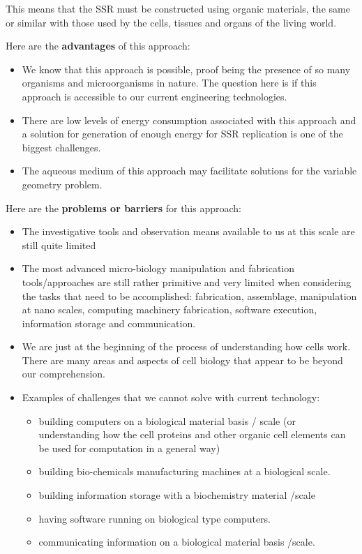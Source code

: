 This means that the SSR must be constructed using organic materials, the
same or similar with those used by the cells, tissues and organs of the
living world.

Here are the \textbf{advantages} of this approach:

\begin{itemize}
\item We know that this approach is possible, proof being the presence
of so many organisms and microorganisms in nature. The question here is
if this approach is accessible to our current engineering technologies.
\item There are low levels of energy consumption associated with this
approach and a solution for generation of enough energy for SSR
replication is one of the biggest challenges.
\item The aqueous medium of this approach may facilitate solutions for
the variable geometry problem.
\end{itemize}

Here are the \textbf{problems or barriers} for this approach:

\begin{itemize}
\item The investigative tools and observation means available to us at
this scale are still quite limited
\item The most advanced micro-biology manipulation and fabrication
tools/approaches are still rather primitive and very limited when
considering the tasks that need to be accomplished: fabrication,
assemblage, manipulation at nano scales, computing machinery
fabrication, software execution, information storage and communication.
\item We are just at the beginning of the process of understanding how
cells work. There are many areas and aspects of cell biology that
appear to be beyond our comprehension.
\item Examples of challenges that we cannot solve with current
technology: 

\begin{itemize}
\item building computers on a biological material basis / scale (or
understanding how the cell proteins and other organic cell elements can
be used for computation in a general way)
\item building bio-chemicals manufacturing machines at a biological
scale.
\item building information storage with a biochemistry material /scale
\item having software running on biological type computers.
\item communicating information on a biological material basis /scale.
\end{itemize}
\end{itemize}

